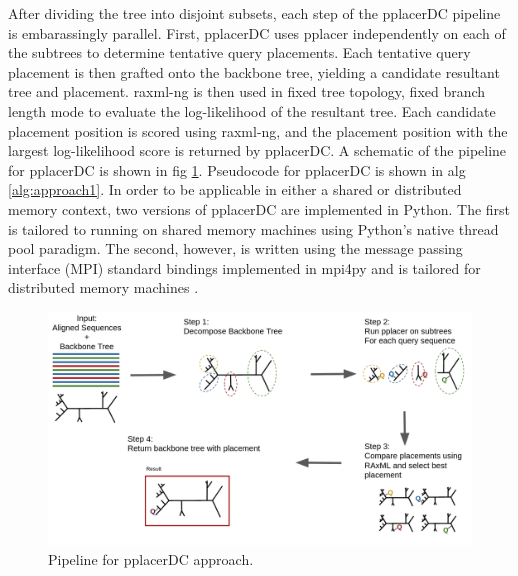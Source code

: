 \documentclass[10pt]{article}
\begin{document}
After dividing the tree into disjoint subsets, each step of the pplacerDC pipeline
is embarassingly parallel.
First, pplacerDC uses pplacer independently on each of the subtrees to determine tentative
query placements.
Each tentative query placement is then grafted onto the backbone tree, yielding a candidate
resultant tree and placement.
raxml-ng \cite{raxml} is then used in fixed tree topology, fixed branch length mode to evaluate
the log-likelihood of the resultant tree.
Each candidate placement position is scored using raxml-ng, and the placement position
with the largest log-likelihood score is returned by pplacerDC.
A schematic of the pipeline for pplacerDC is shown in fig \ref{fig:pplacerDC-pipeline}.
Pseudocode for pplacerDC is shown in alg \ref{alg:approach1}.
In order to be applicable in either a shared or distributed memory context,
two versions of pplacerDC are implemented in Python.
The first is tailored to running on shared memory machines using Python's
native thread pool paradigm.
The second, however, is written using the message passing interface (MPI) standard
bindings implemented in mpi4py and is tailored for distributed memory machines \cite{mpi4py-paper}.

\begin{figure}[!htb]
\centering
\includegraphics[width=\textwidth]{Figs/pplacerDCpipeline.png}
\caption{Pipeline for pplacerDC approach.}
\label{fig:pplacerDC-pipeline}
\end{figure}
\end{document}
